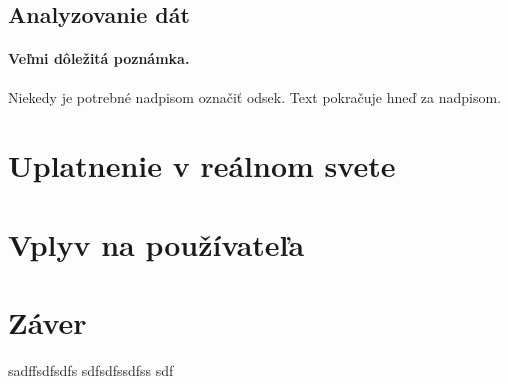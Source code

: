 \documentclass[10pt,twoside,slovak,a4paper]{article}
\begin{document}
\subsection{Analyzovanie dát} \label{ina:Analyzovanie}

\paragraph{Veľmi dôležitá poznámka.}
Niekedy je potrebné nadpisom označiť odsek. Text pokračuje hneď za nadpisom.



\section{Uplatnenie v reálnom svete} \label{uplatnenie}




\section{Vplyv na používateľa} \label{vplyv}




\section{Záver} \label{zaver} %
sadffsdfsdfs
sdfsdfssdfss sdf






\end{document}
